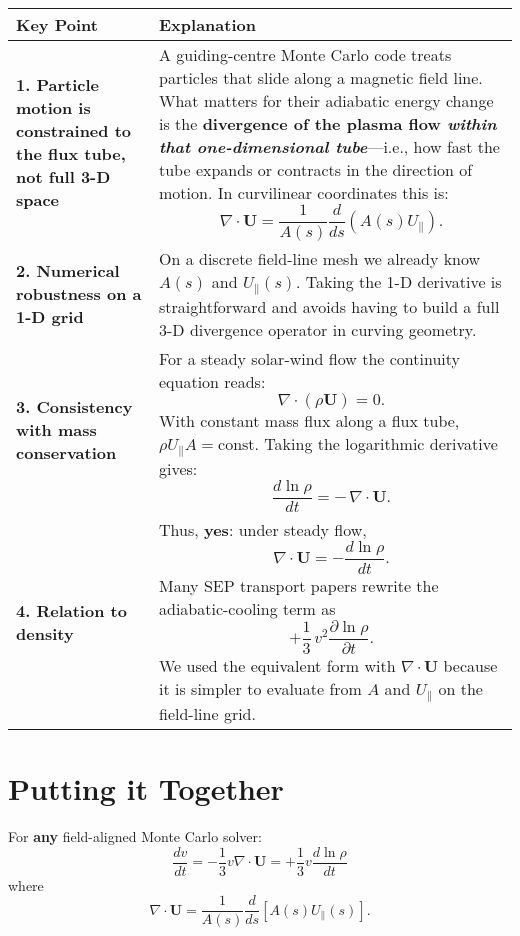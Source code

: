 \begin{center}
\begin{tabular}{@{}p{4.5cm}p{11cm}@{}}
\toprule
\textbf{Key Point} & \textbf{Explanation} \\
\midrule
\textbf{1. Particle motion is constrained to the flux tube, not full 3-D space} & 
A guiding-centre Monte Carlo code treats particles that slide along a magnetic field line. What matters for their adiabatic energy change is the \textbf{divergence of the plasma flow \emph{within that one-dimensional tube}}—i.e., how fast the tube expands or contracts in the direction of motion. In curvilinear coordinates this is:
\[
\boxed{\displaystyle \nabla\!\cdot\!\mathbf{U} = \frac{1}{A(s)}\frac{d}{ds}\left(A(s)U_\parallel\right).}
\] \\
\midrule
\textbf{2. Numerical robustness on a 1-D grid} & 
On a discrete field-line mesh we already know $A(s)$ and $U_\parallel(s)$. Taking the 1-D derivative is straightforward and avoids having to build a full 3-D divergence operator in curving geometry. \\
\midrule
\textbf{3. Consistency with mass conservation} & 
For a steady solar-wind flow the continuity equation reads:
\[
\nabla\!\cdot(\rho\mathbf{U}) = 0.
\]
With constant mass flux along a flux tube, $\rho U_\parallel A = \text{const}$. Taking the logarithmic derivative gives:
\[
\boxed{\displaystyle \frac{d\ln\rho}{dt} = -\,\nabla\!\cdot\!\mathbf{U}.}
\] \\
\midrule
\textbf{4. Relation to density} & 
Thus, \textbf{yes}: under steady flow,
\[
\boxed{\displaystyle \nabla\!\cdot\!\mathbf{U} = -\frac{d\ln\rho}{dt}.}
\]
Many SEP transport papers rewrite the adiabatic-cooling term as
\[
+\frac{1}{3}\,v^2 \frac{\partial\ln\rho}{\partial t}.
\]
We used the equivalent form with $\nabla\!\cdot\!\mathbf{U}$ because it is simpler to evaluate from $A$ and $U_\parallel$ on the field-line grid. \\
\bottomrule
\end{tabular}
\end{center}

\hrulefill

\section*{Putting it Together}

For \textbf{any} field-aligned Monte Carlo solver:
\[
\boxed{\displaystyle
\frac{dv}{dt} = -\frac{1}{3} v \nabla\!\cdot\!\mathbf{U}
= +\frac{1}{3} v \frac{d\ln\rho}{dt}
}
\]
where
\[
\boxed{\displaystyle
\nabla\!\cdot\!\mathbf{U}
= \frac{1}{A(s)}\frac{d}{ds}\left[ A(s) U_\parallel(s) \right].
}
\]

